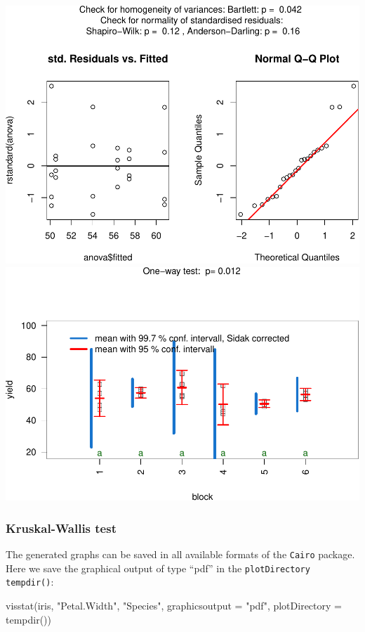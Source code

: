 \documentclass[
]{article}
\newenvironment{Shaded}{\begin{snugshade}}{\end{snugshade}}
\newcommand{\AttributeTok}[1]{\textcolor[rgb]{0.77,0.63,0.00}{#1}}
\newcommand{\FunctionTok}[1]{\textcolor[rgb]{0.00,0.00,0.00}{#1}}
\newcommand{\NormalTok}[1]{#1}
\newcommand{\StringTok}[1]{\textcolor[rgb]{0.31,0.60,0.02}{#1}}
\begin{document}
\includegraphics[width=1\linewidth]{man/figures/README-unnamed-chunk-7-1}
\includegraphics[width=1\linewidth]{man/figures/README-unnamed-chunk-7-2}

\hypertarget{kruskal-wallis-test}{%
\subsubsection{Kruskal-Wallis test}\label{kruskal-wallis-test}}

The generated graphs can be saved in all available formats of the
\texttt{Cairo} package. Here we save the graphical output of type
``pdf'' in the \texttt{plotDirectory} \texttt{tempdir()}:

\begin{Shaded}
\begin{Highlighting}[]
\FunctionTok{visstat}\NormalTok{(iris, }\StringTok{"Petal.Width"}\NormalTok{, }\StringTok{"Species"}\NormalTok{, }\AttributeTok{graphicsoutput =} \StringTok{"pdf"}\NormalTok{, }\AttributeTok{plotDirectory =} \FunctionTok{tempdir}\NormalTok{())}
\end{Highlighting}
\end{Shaded}
\end{document}
